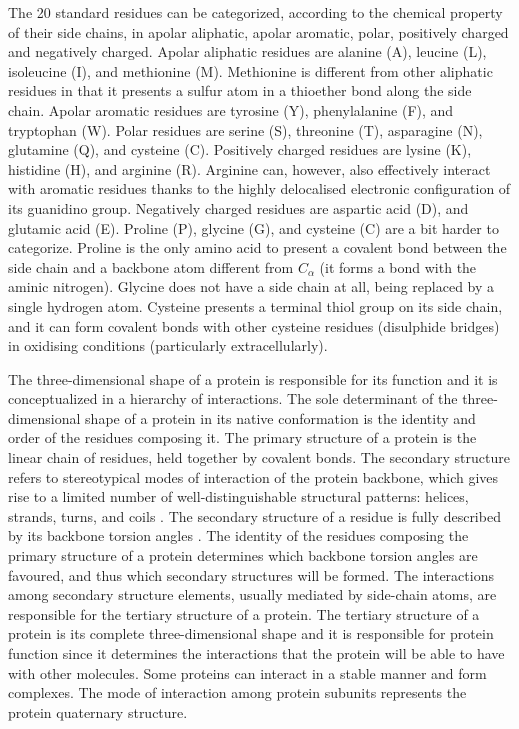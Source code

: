 The \num{20} standard residues can be categorized, according to the chemical property of their side chains, in apolar aliphatic, apolar aromatic, polar, positively charged and negatively charged.
Apolar aliphatic residues are alanine (A), leucine (L), isoleucine (I), and methionine (M).
Methionine is different from other aliphatic residues in that it presents a sulfur atom in a thioether bond along the side chain.
Apolar aromatic residues are tyrosine (Y), phenylalanine (F), and tryptophan (W).
Polar residues are serine (S), threonine (T), asparagine (N), glutamine (Q), and cysteine (C).
Positively charged residues are lysine (K), histidine (H), and arginine (R).
Arginine can, however, also effectively interact with aromatic residues thanks to the highly delocalised electronic configuration of its guanidino group.
Negatively charged residues are aspartic acid (D), and glutamic acid (E).
Proline (P), glycine (G), and cysteine (C) are a bit harder to categorize.
Proline is the only amino acid to present a covalent bond between the side chain and a backbone atom different from $C_\alpha$ (it forms a bond with the aminic nitrogen).
Glycine does not have a side chain at all, being replaced by a single hydrogen atom.
Cysteine presents a terminal thiol group on its side chain, and it can form covalent bonds with other cysteine residues (disulphide bridges) in oxidising conditions (particularly extracellularly).

The three-dimensional shape of a protein is responsible for its function and it is conceptualized in a hierarchy of interactions.
The sole determinant of the three-dimensional shape of a protein in its native conformation is the identity and order of the residues composing it.
The primary structure of a protein is the linear chain of residues, held together by covalent bonds.
The secondary structure refers to stereotypical modes of interaction of the protein backbone, which gives rise to a limited number of well-distinguishable structural patterns: helices, strands, turns, and coils \parencite{Kabsch1983}.
The secondary structure of a residue is fully described by its backbone torsion angles \parencite{Ramachandran1963}.
The identity of the residues composing the primary structure of a protein determines which backbone torsion angles are favoured, and thus which secondary structures will be formed.
The interactions among secondary structure elements, usually mediated by side-chain atoms, are responsible for the tertiary structure of a protein.
The tertiary structure of a protein is its complete three-dimensional shape and it is responsible for protein function since it determines the interactions that the protein will be able to have with other molecules.
Some proteins can interact in a stable manner and form complexes.
The mode of interaction among protein subunits represents the protein quaternary structure.

